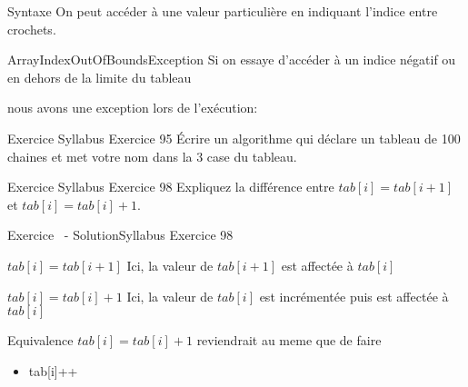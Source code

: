 \begin{frame}{Syntaxe}
    \pause
    On peut accéder à une valeur particulière en indiquant l'indice entre crochets.
    

    \pause
    \begin{alertblock}{ArrayIndexOutOfBoundsException}
        Si on essaye d'accéder à un indice négatif ou en dehors de la limite du tableau
        
        nous avons une exception lors de l'exécution:
        
    \end{alertblock}

\end{frame}

\begin{frame}{Exercice \theexercice}{Syllabus Exercice 95}
    Écrire un algorithme qui déclare un tableau de 100 chaines
    et met votre nom dans la 3\ieme{} case du tableau.
\end{frame}

\begin{frame}{Exercice \theexercice}{Syllabus Exercice 98}
    Expliquez la différence entre $tab[i] = tab[i+1]$
    et $tab[i] = tab[i]+1$.
\end{frame}

\begin{frame}{Exercice \theexercice~- Solution}{Syllabus Exercice 98}
    \pause
    \begin{block}{\textbf{$tab[i] = tab[i+1]$}}
        Ici, la valeur de $tab[i+1]$ est affectée à $tab[i]$
    \end{block}

    \pause
    \begin{block}{\textbf{$tab[i] = tab[i]+1$}}
        Ici, la valeur de $tab[i]$ est incrémentée puis est affectée à $tab[i]$
    \end{block}

    \pause
    \begin{exampleblock}{Equivalence}
        $tab[i] = tab[i]+1$ reviendrait au meme que de faire
        \begin{itemize}
            \item tab[i]++
        \end{itemize}
    \end{exampleblock}
\end{frame}
